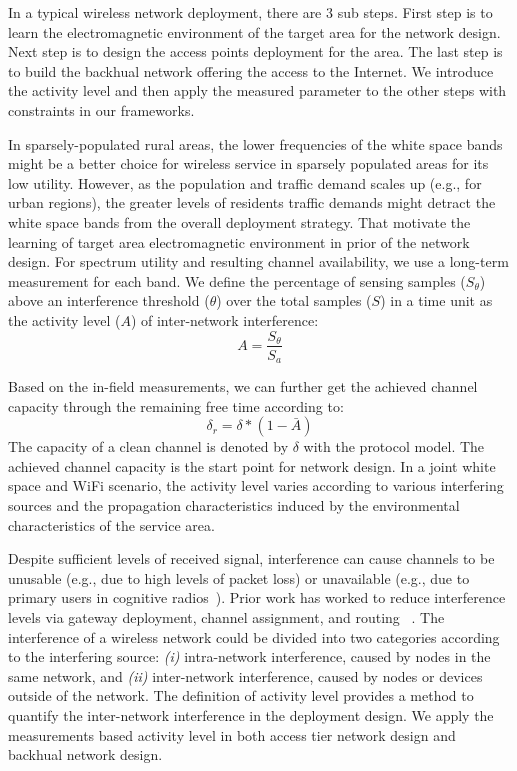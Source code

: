 In a typical wireless network deployment, there are 3 sub steps. First step is to learn the 
electromagnetic environment of the target area for the network design. Next step is to design the 
access points deployment for the area. The last step is to build the backhual network offering 
the access to the Internet. We introduce the activity level and then apply the measured parameter 
to the other steps with constraints in our frameworks. 

%


In sparsely-populated rural areas, the lower frequencies of the white space bands might be a better 
choice for wireless service in sparsely populated areas for its low utility. However, as the population 
and traffic demand scales up (e.g., for urban regions), the greater levels of residents traffic demands 
might detract the white space bands from the overall deployment strategy. That motivate the learning of 
target area electromagnetic environment in prior of the network design. For spectrum utility and resulting 
channel availability, we use a long-term measurement for each band.  We define the percentage of sensing 
samples ($S_\theta$) above an interference threshold ($\theta$) over the total samples ($S$) in a time 
unit as the activity level ($A$) of inter-network interference:
\begin{equation}
\label{eq:actdef}
A=\frac{S_\theta}{S_a}
\end{equation}

Based on the in-field measurements, we can further get the achieved channel capacity through the remaining
free time according to:
\begin{equation}
\label{eq:intercap}
\delta_r=\delta*(1-\bar{A})
\end{equation}
The capacity of a clean channel is denoted by $\delta$ with the protocol model. The achieved channel capacity is
the start point for network design. In a joint white space and WiFi scenario, the activity level varies 
according to various interfering sources and the propagation characteristics induced by the environmental 
characteristics of the service area.


Despite sufficient levels of received signal, interference can cause channels to be unusable (e.g., due to 
high levels of packet loss) or unavailable (e.g., due to primary users in cognitive radios~\cite{haykin2005cognitive}).
Prior work has worked to reduce interference levels via gateway deployment, channel assignment, and routing
~\cite{he2008optimizing,tang2005interference}. The interference of a wireless network could be divided into two 
categories according to the interfering source: {\it (i)} intra-network interference, caused by nodes in the 
same network, and {\it (ii)} inter-network interference, caused by nodes or devices outside of the network. 
The definition of activity level provides a method to quantify the inter-network interference in the deployment design.
We apply the measurements based activity level in both access tier network design and backhual network design.


